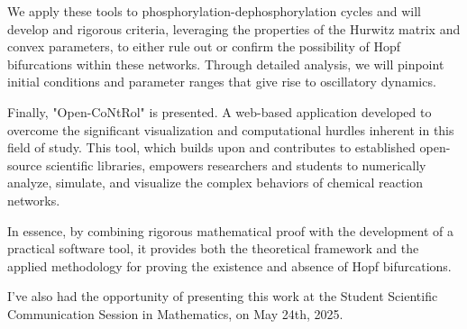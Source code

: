 We apply these tools to phosphorylation-dephosphorylation cycles and will develop and rigorous criteria, leveraging the properties of the Hurwitz matrix and convex parameters, to either rule out or confirm the possibility of Hopf bifurcations within these networks. Through detailed analysis, we will pinpoint initial conditions and parameter ranges that give rise to oscillatory dynamics.

Finally, "Open-CoNtRol" is presented. A web-based application developed to overcome the significant visualization and computational hurdles inherent in this field of study. This tool, which builds upon and contributes to established open-source scientific libraries, empowers researchers and students to numerically analyze, simulate, and visualize the complex behaviors of chemical reaction networks.

In essence,  by combining rigorous mathematical proof with the development of a practical software tool, it provides both the theoretical framework and the applied methodology for proving the existence and absence of Hopf bifurcations.

I've also had the opportunity of presenting this work at the Student Scientific Communication Session in Mathematics, on May 24th, 2025.